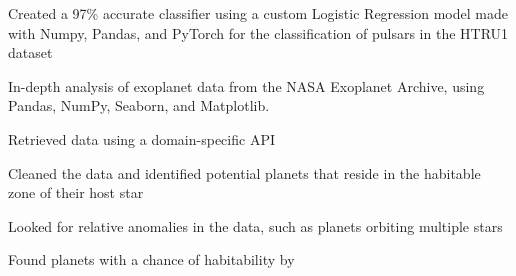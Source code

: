 \documentclass[]{resume-template}
\begin{document}
\begin{minipage}[t]{0.66\textwidth}
    \label{subsec:pulsar-identification}
    \begin{tightemize}
        \item Created a 97\% accurate classifier using a custom Logistic Regression model made with Numpy, Pandas, and PyTorch for the classification of pulsars in the HTRU1 dataset
    \end{tightemize}

    \label{subsec:exo-eda}
    \begin{tightemize}
        \item In-depth analysis of exoplanet data from the NASA Exoplanet Archive, using Pandas, NumPy,
        Seaborn, and Matplotlib.
        \item Retrieved data using a domain-specific API
        \item Cleaned the data and identified potential planets that reside in the habitable zone of their host star
        \item Looked for relative anomalies in the data, such as planets orbiting multiple stars
        \item Found planets with a chance of habitability by 

    \end{tightemize}
    \vspace{\topsep}


\end{minipage}
\end{document}
